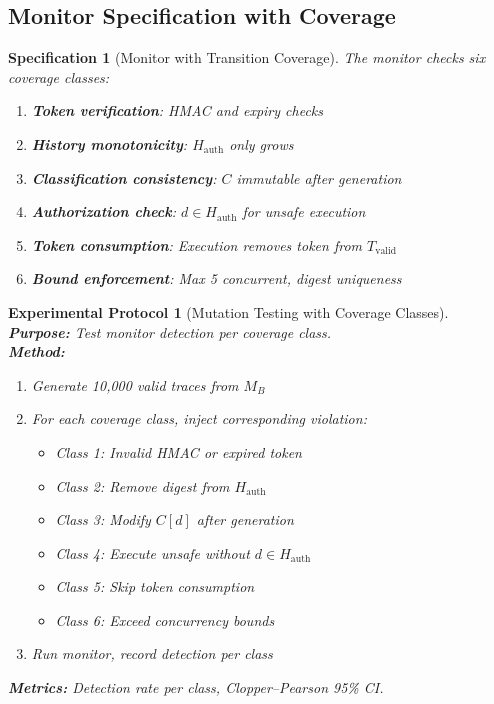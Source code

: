 \documentclass[12pt]{article}
\newtheorem{spec}{Specification}[section]
\newtheorem{protocol}{Experimental Protocol}[section]
\begin{document}
\subsection{Monitor Specification with Coverage}

\begin{spec}[Monitor with Transition Coverage]
The monitor checks six coverage classes:
\begin{enumerate}
    \item \textbf{Token verification}: HMAC and expiry checks
    \item \textbf{History monotonicity}: $H_{\text{auth}}$ only grows
    \item \textbf{Classification consistency}: $C$ immutable after generation
    \item \textbf{Authorization check}: $d \in H_{\text{auth}}$ for unsafe execution
    \item \textbf{Token consumption}: Execution removes token from $T_{\text{valid}}$
    \item \textbf{Bound enforcement}: Max 5 concurrent, digest uniqueness
\end{enumerate}
\end{spec}

\begin{protocol}[Mutation Testing with Coverage Classes]
\textbf{Purpose:} Test monitor detection per coverage class.\\
\textbf{Method:}
\begin{enumerate}
    \item Generate 10,000 valid traces from $M_B$
    \item For each coverage class, inject corresponding violation:
    \begin{itemize}
        \item Class 1: Invalid HMAC or expired token
        \item Class 2: Remove digest from $H_{\text{auth}}$
        \item Class 3: Modify $C[d]$ after generation
        \item Class 4: Execute unsafe without $d \in H_{\text{auth}}$
        \item Class 5: Skip token consumption
        \item Class 6: Exceed concurrency bounds
    \end{itemize}
    \item Run monitor, record detection per class
\end{enumerate}
\textbf{Metrics:} Detection rate per class, Clopper--Pearson 95\% CI.
\end{protocol}
\end{document}
